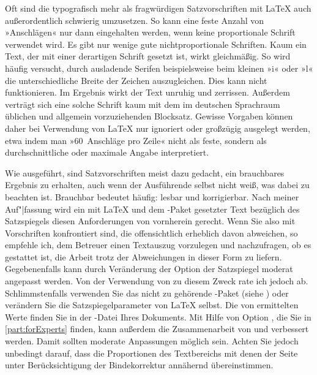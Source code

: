 Oft sind die typografisch mehr als fragwürdigen Satzvorschriften mit {\LaTeX}
auch außerordentlich schwierig umzusetzen. So kann eine feste Anzahl von
»Anschlägen« nur dann eingehalten werden, wenn keine proportionale Schrift
verwendet wird. Es gibt nur wenige gute nichtproportionale Schriften.
\iftrue %
Kaum ein Text, der mit einer derartigen Schrift gesetzt ist, wirkt
gleichmäßig. So wird häufig %
\else Häufig wird %
\fi %
versucht, durch ausladende Serifen beispielsweise beim kleinen »i« oder »l«
die unterschiedliche Breite der Zeichen auszugleichen. Dies kann nicht
funktionieren. Im Ergebnis wirkt der Text unruhig und zerrissen. Außerdem
verträgt sich eine solche Schrift kaum mit dem im deutschen Sprachraum
üblichen und allgemein vorzuziehenden Blocksatz. Gewisse Vorgaben können daher
bei Verwendung von {\LaTeX} nur ignoriert oder großzügig ausgelegt werden,
etwa indem man »60~Anschläge pro Zeile« nicht als feste, sondern als
durchschnittliche oder maximale Angabe interpretiert.

Wie ausgeführt, sind Satzvorschriften meist dazu gedacht, ein brauchbares
Ergebnis zu erhalten, auch wenn der Ausführende selbst nicht weiß, was dabei
zu beachten ist. Brauchbar bedeutet häufig: lesbar und korrigierbar. Nach
meiner Auf"|fassung wird ein mit {\LaTeX} und dem -Paket
gesetzter Text bezüglich des Satzspiegels diesen Anforderungen von vornherein
gerecht. Wenn Sie also mit Vorschriften konfrontiert sind, die offensichtlich
erheblich davon abweichen, so empfehle ich, dem Betreuer einen Textauszug
vorzulegen und nachzufragen, ob es gestattet ist, die Arbeit trotz der
Abweichungen in dieser Form zu liefern. Gegebenenfalls kann durch Veränderung
der Option
 der
Satzspiegel moderat angepasst werden. Von der Verwendung von
 zu diesem Zweck rate ich jedoch
ab. Schlimmstenfalls verwenden Sie das nicht zu {\KOMAScript} gehörende
-Paket
(siehe \cite{package:geometry}) oder verändern Sie die Satzspiegelparameter
von {\LaTeX} selbst. Die von  ermittelten Werte finden Sie
in der -Datei Ihres Dokuments. Mit Hilfe von Option
%
, die Sie in
\autoref{part:forExperts} finden, kann außerdem die Zusammenarbeit von
 und  verbessert werden. Damit sollten
moderate Anpassungen möglich sein. Achten Sie jedoch unbedingt darauf, dass
die Proportionen des Textbereichs mit denen der Seite unter Berücksichtigung
der Bindekorrektur annähernd übereinstimmen.

